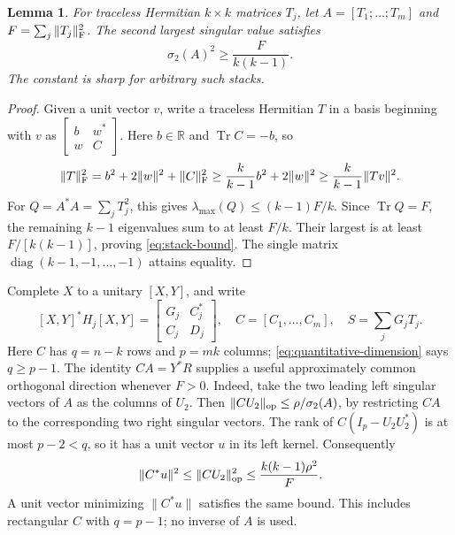 \documentclass[11pt]{article}
\newcommand{\C}{\mathbb C}
\DeclareMathOperator{\Tr}{Tr}
\newtheorem{lemma}[theorem]{Lemma}
\theoremstyle{remark}
\numberwithin{equation}{section}
\begin{document}
\begin{lemma}\label{lem:stack}
For traceless Hermitian $k\times k$ matrices $T_j$, let
$A=[T_1;\ldots;T_m]$ and $F=\sum_j\|T_j\|_{\rm F}^2$.
The second largest singular value satisfies
\begin{equation}\label{eq:stack-bound}
 \sigma_2(A)^2\ge\frac{F}{k(k-1)}.
\end{equation}
The constant is sharp for arbitrary such stacks.
\end{lemma}

\begin{proof}
Given a unit vector $v$, write a traceless Hermitian $T$ in a basis
beginning with $v$ as $\left[\begin{smallmatrix}b&w^*\\w&C\end{smallmatrix}\right]$.
Here $b\in\mathbb R$ and $\Tr C=-b$, so
\[
 \|T\|_{\rm F}^2
 =b^2+2\|w\|^2+\|C\|_{\rm F}^2
 \ge\frac{k}{k-1}b^2+2\|w\|^2
 \ge\frac{k}{k-1}\|Tv\|^2.
\]
For $Q=A^*A=\sum_jT_j^2$, this gives
$\lambda_{\max}(Q)\le(k-1)F/k$. Since $\Tr Q=F$, the remaining
$k-1$ eigenvalues sum to at least $F/k$. Their largest is at least
$F/[k(k-1)]$, proving \eqref{eq:stack-bound}. The single matrix
$\operatorname{diag}(k-1,-1,\ldots,-1)$ attains equality.
\end{proof}

Complete $X$ to a unitary $[X,Y]$, and write
\begin{equation}\label{eq:block-hessian-data}
 [X,Y]^*H_j[X,Y]=
 \begin{bmatrix}G_j&C_j^*\\C_j&D_j\end{bmatrix},\quad
 C=[C_1,\ldots,C_m],\quad S=\sum_jG_jT_j.
\end{equation}
Here $C$ has $q=n-k$ rows and $p=mk$ columns; \eqref{eq:quantitative-dimension}
says $q\ge p-1$. The identity $CA=Y^*R$ supplies a useful
approximately common orthogonal direction whenever $F>0$.
Indeed, take the two leading left singular vectors of $A$ as the
columns of $U_2$. Then
$\|CU_2\|_{\rm op}\le\rho/\sigma_2(A)$, by restricting
$CA$ to the corresponding two right singular vectors.
The rank of $C(I_p-U_2U_2^*)$ is at most $p-2<q$, so it has
a unit vector $u$ in its left kernel. Consequently
\begin{equation}\label{eq:approx-common}
 \|C^*u\|^2\le\|CU_2\|_{\rm op}^2
 \le\frac{k(k-1)\rho^2}{F}.
\end{equation}
A unit vector minimizing $\|C^*u\|$ satisfies the same bound.
This includes rectangular $C$ with $q=p-1$; no inverse of $A$ is used.
\end{document}
